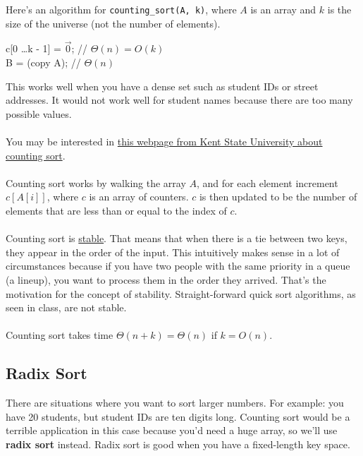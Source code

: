 \documentclass[]{article}
\theoremstyle{definition}
\newcommand{\lecture}[1]{\marginpar{{\footnotesize $\leftarrow$ \underline{#1}}}}
\begin{document}
				Here's an algorithm for \verb+counting_sort(A, k)+, where $A$ is an array and $k$ is the size of the universe (not the number of elements). \\
				\begin{algorithm}[H]
					c[0 \ldots k - 1] = $\vec 0$; // $\Theta(n) = O(k)$ \\
					B = (copy A); // $\Theta(n)$ \\
				\end{algorithm}
				This works well when you have a dense set such as student IDs or street addresses. It would not work well for student names because there are too many possible values. \lecture{February 5, 2013}
				\\ \\
				You may be interested in \href{http://www.personal.kent.edu/~rmuhamma/Algorithms/MyAlgorithms/Sorting/countingSort.htm}{this webpage from Kent State University about counting sort}.
				\\ \\
				Counting sort works by walking the array $A$, and for each element increment $c[A[i]]$, where $c$ is an array of counters. $c$ is then updated to be the number of elements that are less than or equal to the index of $c$.
				\\ \\
				Counting sort is \underline{stable}. That means that when there is a tie between two keys, they appear in the order of the input. This intuitively makes sense in a lot of circumstances because if you have two people with the same priority in a queue (a lineup), you want to process them in the order they arrived. That's the motivation for the concept of stability. Straight-forward quick sort algorithms, as seen in class, are not stable.
				\\ \\
				Counting sort takes time $\Theta(n + k) = \Theta(n)$ if $k = O(n)$.
			\subsection{Radix Sort}
				There are situations where you want to sort larger numbers. For example: you have 20 students, but student IDs are ten digits long. Counting sort would be a terrible application in this case because you'd need a huge array, so we'll use \textbf{radix sort} instead. Radix sort is good when you have a fixed-length key space.
\end{document}
